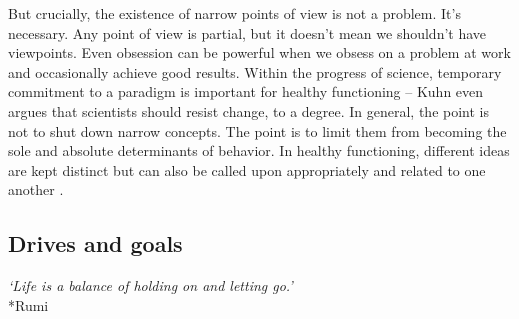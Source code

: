 \documentclass[12pt]{article}
\begin{document}
But crucially, the existence of narrow points of view is not a problem. It's necessary. Any point of view is partial, but it doesn't mean we shouldn't have viewpoints. Even obsession can be powerful when we obsess on a problem at work and occasionally achieve good results. Within the progress of science, temporary commitment to a paradigm is important for healthy functioning -- Kuhn even argues that scientists should resist change, to a degree. In general, the point is not to shut down narrow concepts. The point is to limit them from becoming the sole and absolute determinants of behavior. In healthy functioning, different ideas are kept distinct but can also be called upon appropriately and related to one another \citep{hatano1984two, tetlock1986value, herzog2014harnessing, gigerenzer2011heuristic}. 





\subsection{Drives and goals}

\begin{center}
\textit{`Life is a balance of holding on and letting go.'}\\*Rumi
\end{center}
\end{document}
